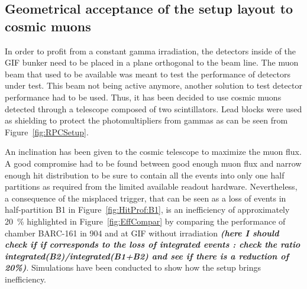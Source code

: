 	\subsection{Geometrical acceptance of the setup layout to cosmic muons}
	\label{ssec:GeoAcc}
				
		In order to profit from a constant gamma irradiation, the detectors inside of the GIF bunker need to be placed in a plane orthogonal to the beam line. The muon beam that used to be available was meant to test the performance of detectors under test. This beam not being active anymore, another solution to test detector performance had to be used. Thus, it has been decided to use cosmic muons detected through a telescope composed of two scintillators. Lead blocks were used as shielding to protect the photomultipliers from gammas as can be seen from Figure~\ref{fig:RPCSetup}.
					
		An inclination has been given to the cosmic telescope to maximize the muon flux. A good compromise had to be found between good enough muon flux and narrow enough hit distribution to be sure to contain all the events into only one half partitions as required from the limited available readout hardware. Nevertheless, a consequence of the misplaced trigger, that can be seen as a loss of events in half-partition B1 in Figure~\ref{fig:HitProf:B1}, is an inefficiency of approximately \SI{20}{\%} highlighted in Figure~\ref{fig:EffCompar} by comparing the performance of chamber BARC-161 in 904 and at GIF without irradiation \textit{\textbf{(here I should check if if corresponds to the loss of integrated events : check the ratio integrated(B2)/integrated(B1+B2) and see if there is a reduction of 20\%)}}. Simulations have been conducted to show how the setup brings inefficiency.
	
